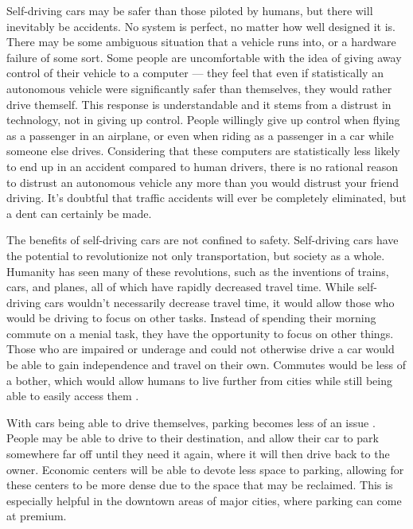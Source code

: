\documentclass{mla}
\begin{document}
Self-driving cars may be safer than those piloted by humans, but there will inevitably be accidents. No system is perfect, no matter how well designed it is. There may be some ambiguous situation that a vehicle runs into, or a hardware failure of some sort. Some people are uncomfortable with the idea of giving away control of their vehicle to a computer --- they feel that even if statistically an autonomous vehicle were significantly safer than themselves, they would rather drive themself. This response is understandable and it stems from a distrust in technology, not in giving up control. People willingly give up control when flying as a passenger in an airplane, or even when riding as a passenger in a car while someone else drives. Considering that these computers are statistically less likely to end up in an accident compared to human drivers, there is no rational reason to distrust an autonomous vehicle any more than you would distrust your friend driving. It's doubtful that traffic accidents will ever be completely eliminated, but a dent can certainly be made.

The benefits of self-driving cars are not confined to safety. Self-driving cars have the potential to revolutionize not only transportation, but society as a whole. Humanity has seen many of these revolutions, such as the inventions of trains, cars, and planes, all of which have rapidly decreased travel time. While self-driving cars wouldn't necessarily decrease travel time, it would allow those who would be driving to focus on other tasks. Instead of spending their morning commute on a menial task, they have the opportunity to focus on other things. Those who are impaired or underage and could not otherwise drive a car would be able to gain independence and travel on their own. Commutes would be less of a bother, which would allow humans to live further from cities while still being able to easily access them \cite{Zakharenko2016}.

With cars being able to drive themselves, parking becomes less of an issue \cite{Zakharenko2016}. People may be able to drive to their destination, and allow their car to park somewhere far off until they need it again, where it will then drive back to the owner. Economic centers will be able to devote less space to parking, allowing for these centers to be more dense due to the space that may be reclaimed. This is especially helpful in the downtown areas of major cities, where parking can come at premium.
\end{document}
